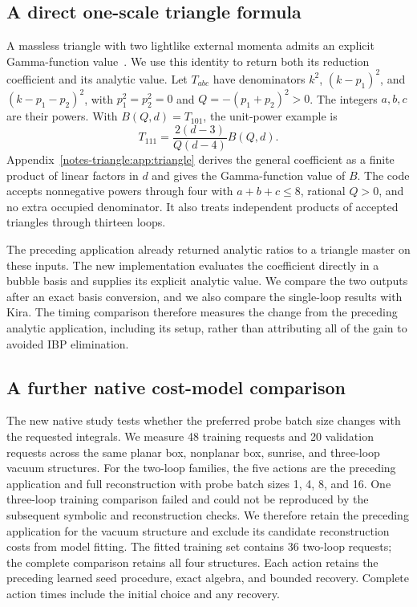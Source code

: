 \subsection{A direct one-scale triangle formula}
A massless triangle with two lightlike external momenta admits an explicit Gamma-function value~\cite{DavydychevOsland1998}. We use this identity to return both its reduction coefficient and its analytic value. Let $T_{abc}$ have denominators $k^2$, $(k-p_1)^2$, and $(k-p_1-p_2)^2$, with $p_1^2=p_2^2=0$ and $Q=-(p_1+p_2)^2>0$. The integers $a,b,c$ are their powers. With $B(Q,d)=T_{101}$, the unit-power example is
\begin{equation}
 T_{111}=\frac{2(d-3)}{Q(d-4)}B(Q,d).
 \label{notes-triangle:eq:triangle-main}
\end{equation}
Appendix~\ref{notes-triangle:app:triangle} derives the general coefficient as a finite product of linear factors in $d$ and gives the Gamma-function value of $B$. The code accepts nonnegative powers through four with $a+b+c\leq8$, rational $Q>0$, and no extra occupied denominator. It also treats independent products of accepted triangles through thirteen loops.

The preceding application already returned analytic ratios to a triangle master on these inputs. The new implementation evaluates the coefficient directly in a bubble basis and supplies its explicit analytic value. We compare the two outputs after an exact basis conversion, and we also compare the single-loop results with Kira. The timing comparison therefore measures the change from the preceding analytic application, including its setup, rather than attributing all of the gain to avoided IBP elimination.
\subsection{A further native cost-model comparison}
The new native study tests whether the preferred probe batch size changes with the requested integrals. We measure 48 training requests and 20 validation requests across the same planar box, nonplanar box, sunrise, and three-loop vacuum structures. For the two-loop families, the five actions are the preceding application and full reconstruction with probe batch sizes 1, 4, 8, and 16. One three-loop training comparison failed and could not be reproduced by the subsequent symbolic and reconstruction checks. We therefore retain the preceding application for the vacuum structure and exclude its candidate reconstruction costs from model fitting. The fitted training set contains 36 two-loop requests; the complete comparison retains all four structures. Each action retains the preceding learned seed procedure, exact algebra, and bounded recovery. Complete action times include the initial choice and any recovery.

